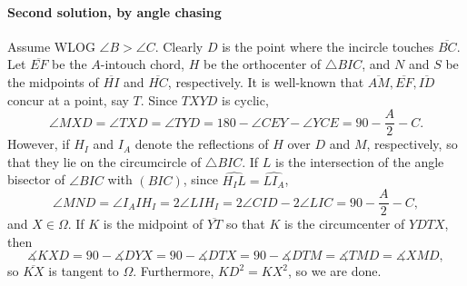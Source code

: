 \paragraph{Second solution, by angle chasing}     Assume WLOG $\angle B>\angle C$. Clearly $D$ is the point where the incircle touches $\overline{BC}$. Let $\overline{EF}$ be the $A$-intouch chord, $H$ be the orthocenter of $\triangle BIC$, and $N$ and $S$ be the midpoints of $\overline{HI}$ and $\overline{HC}$, respectively. It is well-known that $\overline{AM},\overline{EF},\overline{ID}$ concur at a point, say $T$. Since $TXYD$ is cyclic, \[\angle MXD=\angle TXD=\angle TYD=180-\angle CEY-\angle YCE=90-\frac{A}2-C.\]
However, if $H_I$ and $I_A$ denote the reflections of $H$ over $D$ and $M$, respectively, so that they lie on the circumcircle of $\triangle BIC$. If $L$ is the intersection of the angle bisector of $\angle BIC$ with $(BIC)$, since $\widehat{H_IL}=\widehat{LI_A}$, \[\angle MND=\angle I_AIH_I=2\angle LIH_I=2\angle CID-2\angle LIC=90-\frac{A}2-C,\]
and $X\in\Omega$. If $K$ is the midpoint of $\overline{YT}$ so that $K$ is the circumcenter of $YDTX$, then \[\measuredangle KXD=90-\measuredangle DYX=90-\measuredangle DTX=90-\measuredangle DTM=\measuredangle TMD=\measuredangle XMD,\]
so $\overline{KX}$ is tangent to $\Omega$. Furthermore, $KD^2=KX^2$, so we are done.

